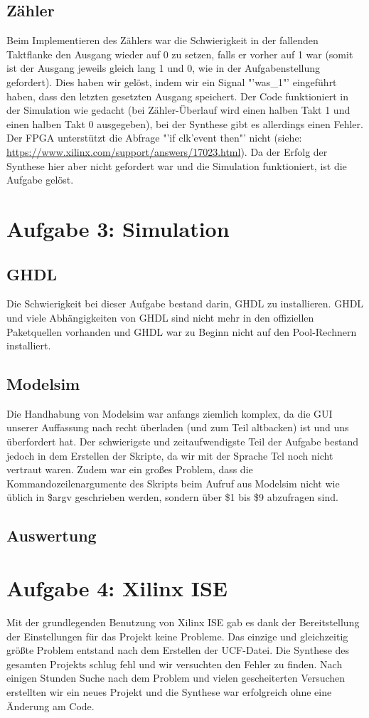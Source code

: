 \documentclass[parskip=full]{scrartcl}
\begin{document}
		\subsection{Zähler}
			Beim Implementieren des Zählers war die Schwierigkeit in der fallenden Taktflanke den Ausgang wieder auf 0 zu setzen, falls er vorher auf 1 war (somit ist der Ausgang jeweils gleich lang 1 und 0, wie in der Aufgabenstellung gefordert). Dies haben wir gelöst, indem wir ein Signal "'was\_1"' eingeführt haben, dass den letzten gesetzten Ausgang speichert. Der Code funktioniert in der Simulation wie gedacht (bei Zähler-Überlauf wird einen halben Takt 1 und einen halben Takt 0 ausgegeben), bei der Synthese gibt es allerdings einen Fehler. Der FPGA unterstützt die Abfrage "'if clk'event then"' nicht (siehe: \url{https://www.xilinx.com/support/answers/17023.html}). Da der Erfolg der Synthese hier aber nicht gefordert war und die Simulation funktioniert, ist die Aufgabe gelöst.
			
	\section*{Aufgabe 3: Simulation}
		\setcounter{section}{3}
		\setcounter{subsection}{0}
		\subsection{GHDL}
			Die Schwierigkeit bei dieser Aufgabe bestand darin, GHDL zu installieren. GHDL und viele Abhängigkeiten von GHDL sind nicht mehr in den offiziellen Paketquellen vorhanden und GHDL war zu Beginn nicht auf den Pool-Rechnern installiert.
		\subsection{ Modelsim}
			Die Handhabung von Modelsim war anfangs ziemlich komplex, da die GUI unserer Auffassung nach recht überladen (und zum Teil altbacken) ist und uns überfordert hat. Der schwierigste und zeitaufwendigste Teil der Aufgabe bestand jedoch in dem Erstellen der Skripte, da wir mit der Sprache Tcl noch nicht vertraut waren. Zudem war ein großes Problem, dass die Kommandozeilenargumente des Skripts beim Aufruf aus Modelsim nicht wie üblich in \$argv geschrieben werden, sondern über \$1 bis \$9 abzufragen sind.
		\subsection{Auswertung}
	\section*{Aufgabe 4: Xilinx ISE}
		Mit der grundlegenden Benutzung von Xilinx ISE gab es dank der Bereitstellung der Einstellungen für das Projekt keine Probleme. Das einzige und gleichzeitig größte Problem entstand nach dem Erstellen der UCF-Datei. Die Synthese des gesamten Projekts schlug fehl und wir versuchten den Fehler zu finden. Nach einigen Stunden Suche nach dem Problem und vielen gescheiterten Versuchen erstellten wir ein neues Projekt und die Synthese war erfolgreich ohne eine Änderung am Code.
		
\end{document}
